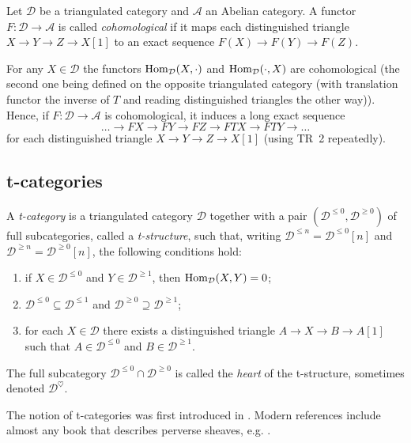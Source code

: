 \documentclass[english]{short-notes}
\renewcommand\cat{\mathcal}
\begin{document}
\begin{Def}
    Let $\cat D$ be a triangulated category and $\cat A$ an Abelian category.
    A functor $F\colon \cat D → \cat A$ is called \emph{cohomological} if it maps each distinguished triangle $X → Y → Z → X[1]$ to an exact sequence $F(X) → F(Y) → F(Z)$.
\end{Def}

\begin{Ex}
    For any $X ∈ \cat D$ the functors $\Hom_{\cat D}(X,\cdot)$ and $\Hom_{\cat D}(\cdot, X)$  are cohomological (the second one being defined on the opposite triangulated category (with translation functor the inverse of $T$ and reading distinguished triangles the other way)).
    Hence, if $F\colon \cat D → \cat A$ is cohomological, it induces a long exact sequence
    \[
    \dotsc → FX → FY → FZ → FTX → FTY → \dotsc
    \]
    for each distinguished triangle $X → Y → Z → X[1]$ (using TR~2 repeatedly).
\end{Ex}

\subsection{t-categories}

\begin{Def}
    A \emph{t-category} is a triangulated category $\cat D$ together with a pair $(\cat D^{≤0},\cat D^{≥0})$ of full subcategories, called a \emph{t-structure}, such that, writing $\cat D^{≤n} = \cat D^{≤0}[n]$ and $\cat D^{≥n} = \cat D^{≥0}[n]$, the following conditions hold:
    \begin{enumerate}
        \item if $X ∈ \cat D^{≤0}$ and $Y ∈ \cat D^{≥1}$, then $\Hom_{\cat D}(X,Y) = 0$;
        \item $\cat D^{≤0} ⊆ \cat D^{≤1}$ and $\cat D^{≥0} ⊇ \cat D^{≥1}$;
        \item for each $X ∈ \cat D$ there exists a distinguished triangle $A → X → B → A[1]$ such that $A ∈ \cat D^{≤0}$ and $B ∈ \cat D^{≥1}$.
    \end{enumerate}

    The full subcategory $\cat D^{≤0} ∩ \cat D^{≥0}$ is called the \emph{heart} of the t-structure, sometimes denoted $\cat D^\heartsuit$.
\end{Def}

The notion of t-categories was first introduced in \cite{BeilinsonBernsteinDeligne:1982:FaisceauxPervers}.
Modern references include almost any book that describes perverse sheaves, e.g. \cite{HottaTakeuchiTanisaki:2008:DModulesPerverseSheavesRepresentationTheory, PetersSteenbrink:2008:MixedHodgeStructures, KashiwaraSchapira:1994:SheavesOnManifolds}.
\end{document}
